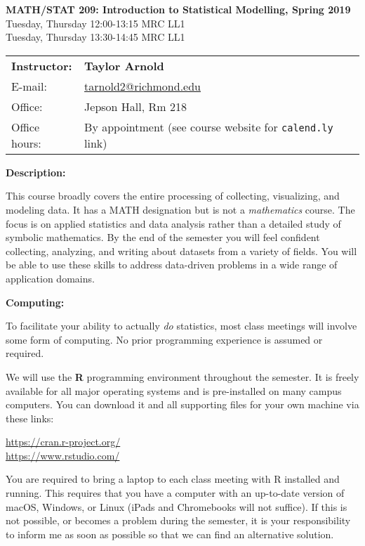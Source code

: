 \documentclass[12pt]{article}
\begin{document}
\begin{center}
{\bf MATH/STAT 209: Introduction to Statistical Modelling, Spring 2019} \\
Tuesday, Thursday 12:00-13:15 \quad MRC LL1\\
Tuesday, Thursday 13:30-14:45 \quad MRC LL1
\end{center}

\bigskip

\noindent
\begin{tabular}{ l l }
{\bf Instructor:} &  {\bf Taylor Arnold} \\
E-mail: & \href{mailto:tarnold2@richmond.edu}{tarnold2@richmond.edu} \\
Office: & Jepson Hall, Rm 218 \\
Office hours: & By appointment (see course website for \texttt{calend.ly} link)
\end{tabular}

\vspace{0.5cm}

\textbf{Description:} \vspace{6pt}

This course broadly covers the entire processing of collecting, visualizing,
and modeling data. It has a MATH designation but is not a \textit{mathematics}
course. The focus is on applied statistics and data analysis rather than a
detailed study of symbolic mathematics. By the end of the semester you will
feel confident collecting, analyzing, and writing about datasets from a
variety of fields. You will be able to use these skills to address data-driven
problems in a wide range of application domains.

\bigskip

\textbf{Computing:} \vspace{6pt}

To facilitate your ability to actually \textit{do} statistics, most class
meetings will involve some form of computing. No prior programming experience
is assumed or required.

\medskip

We will use the \textbf{R} programming environment throughout the
semester. It is freely available for all major operating systems and
is pre-installed on many campus computers. You can download it and
all supporting files for your own machine via these links:
\begin{center}
\url{https://cran.r-project.org/} \\
\url{https://www.rstudio.com/}
\end{center}
You are required to bring a laptop to each class meeting with R installed
and running. This requires that you have a computer with an up-to-date
version of macOS, Windows, or Linux (iPads and Chromebooks will not suffice).
If this is not possible, or becomes a problem during the semester, it is your
responsibility to inform me as soon as possible so that we can find an
alternative solution.
\end{document}
